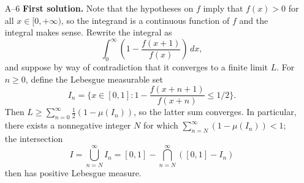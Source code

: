 \documentclass[amssymb,twocolumn,pra,10pt,aps]{revtex4-1}
\newcommand{\RR}{\mathbb{R}}
\begin{document}
\begin{itemize}
We proceed now to the proof. Assume by way of contradiction that there exist $\mathbf{a},\mathbf{b} \in G$ with $\mathbf{a} \times \mathbf{b}
\neq 0$. Put $\mathbf{c} = \mathbf{a}\times \mathbf{b} = \mathbf{a}*\mathbf{b}$, so that $\mathbf{a},\mathbf{b},\mathbf{c}$ are nonzero and linearly independent. Let $\mathbf{e}$ be the identity
element of $G$. Since $\mathbf{e}$ commutes with $\mathbf{a},\mathbf{b},\mathbf{c}$, by Lemma~3 we have $\mathbf{e} \times \mathbf{a} = \mathbf{e} \times \mathbf{b} = \mathbf{e} \times \mathbf{c} = 0$.
Since $\mathbf{a},\mathbf{b},\mathbf{c}$ span $\RR^3$, $\mathbf{e} \times \mathbf{x} = 0$ for all $\mathbf{x} \in \RR^3$, so $\mathbf{e} = 0$.

Since $\mathbf{b},\mathbf{c}$, and $\mathbf{b} \times \mathbf{c} = \mathbf{b}*\mathbf{c}$ are nonzero and mutually orthogonal, Lemma~2 implies
\[
\mathbf{b}*\mathbf{b} = \mathbf{c}*\mathbf{c} = (\mathbf{b}*\mathbf{c})*(\mathbf{b}*\mathbf{c}) = 0 = \mathbf{e}.
\]
Hence $\mathbf{b}*\mathbf{c} = \mathbf{c}*\mathbf{b}$, contradicting Lemma~3 because $\mathbf{b} \times \mathbf{c} \neq 0$.
The desired result follows.

\item[A--6]
\textbf{First solution.}
Note that the hypotheses on $f$ imply that $f(x) > 0$ for all $x \in [0, +\infty)$,
so the integrand is a continuous function of $f$ and the integral makes sense. Rewrite the integral as
\[
\int_0^\infty \left(1 - \frac{f(x+1)}{f(x)} \right)\,dx,
\]
and suppose by way of contradiction that it converges to a finite limit $L$.
For $n \geq 0$, define the Lebesgue measurable set
\[
I_n = \{x \in [0,1]: 1 - \frac{f(x+n+1)}{f(x+n)} \leq 1/2 \}.
\]
Then $L \geq \sum_{n=0}^\infty \frac{1}{2} (1 - \mu(I_n))$,
so the latter sum converges.
In particular, there exists a nonnegative integer $N$ for which $\sum_{n=N}^\infty (1 - \mu(I_n)) < 1$;
the intersection
\[
I = \bigcup_{n=N}^\infty I_n = [0,1] - \bigcap_{n=N}^\infty ([0,1] - I_n)
\]
then has positive Lebesgue measure.


\end{itemize}
\end{document}
